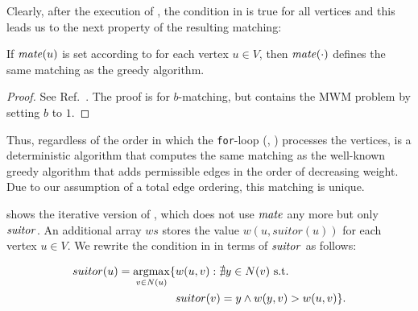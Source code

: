 Clearly, after the execution of , the condition in 
is true for all vertices and this leads us to the next property of the resulting matching:

\begin{lemma}
\label{lemma:dyn-mwm:mate-greedy}
If $\mathit{mate}(u)$ is set according to  for each vertex $u \in V$, then
$\mathit{mate}(\cdot)$ defines the same matching as the greedy algorithm.
\end{lemma}

\begin{proof}
See Ref.~\cite[Section 3.2]{DBLP:journals/siamsc/KhanPPSSMHD16}. The proof is
for $b$-matching, but contains the MWM problem by setting $b$ to $1$.
\end{proof}




Thus, regardless of the order in which the \texttt{for}-loop
(, ) processes the
vertices, \suitor is a deterministic algorithm that computes the same matching
as the well-known greedy algorithm that adds permissible edges in the order of
decreasing weight. Due to our assumption of a total edge ordering, this matching
is unique.

 shows the iterative version of \suitor, which does not
use $\mathit{mate}$ any more but only $\mathit{suitor}$. An additional array $ws$ stores the
value $w(u, suitor(u))$ for each vertex $u \in V$. We rewrite the condition
in  in terms of $\mathit{suitor}$ as follows:

\begin{equation}
\label{eq:suitor}
\begin{split}
    suitor(u) = \operatorname*{argmax}_{v \in N(u)}\{&w(u, v) : \nexists y \in N(v)\ \text{s.t.}\\
                                      &suitor(v) = y \wedge w(y, v) > w(u, v)\}.
\end{split}
\end{equation}

